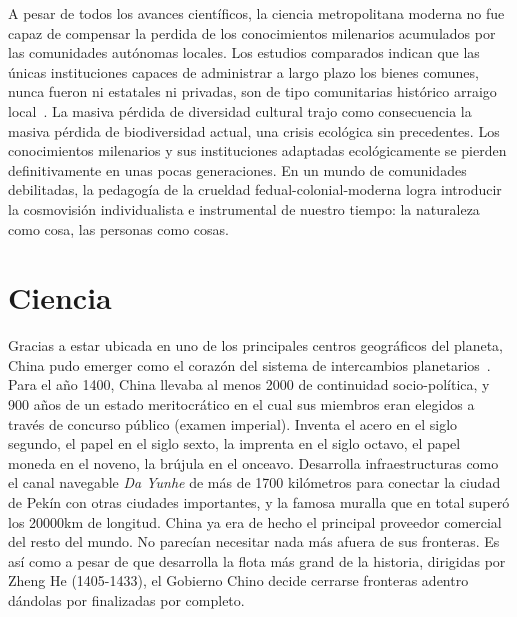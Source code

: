 \documentclass[a4paper,10pt]{book}
\begin{document}


% 

A pesar de todos los avances científicos, la ciencia metropolitana moderna no fue capaz de compensar la perdida de los conocimientos milenarios acumulados por las comunidades autónomas locales.
Los estudios comparados indican que las únicas instituciones capaces de administrar a largo plazo los bienes comunes, nunca fueron ni estatales ni privadas, son de tipo comunitarias histórico arraigo local~\cite{ostrom2009,ostrom1990}.
La masiva pérdida de diversidad cultural trajo como consecuencia la masiva pérdida de biodiversidad actual, una crisis ecológica sin precedentes.
Los conocimientos milenarios y sus instituciones adaptadas ecológicamente se pierden definitivamente en unas pocas generaciones.
En un mundo de comunidades debilitadas, la pedagogía de la crueldad fedual-colonial-moderna logra introducir la cosmovisión individualista e instrumental de nuestro tiempo: la naturaleza como cosa, las personas como cosas.

\section{Ciencia}

Gracias a estar ubicada en uno de los principales centros geográficos del planeta, China pudo emerger como el corazón del sistema de intercambios planetarios~\cite{pomeranz2000}.
Para el año 1400, China llevaba al menos 2000 de continuidad socio-pol\'itica, y 900 a\~nos de un estado meritocr\'atico en el cual sus miembros eran elegidos a trav\'es de concurso público (examen imperial).
Inventa el acero en el siglo segundo, el papel en el siglo sexto, la imprenta en el siglo octavo, el papel moneda en el noveno, la br\'ujula en el onceavo.
Desarrolla infraestructuras como el canal navegable \emph{Da Yunhe} de más de 1700 kilómetros para conectar la ciudad de Pekín con otras ciudades importantes, y la famosa muralla que en total superó los 20000km de longitud.
China ya era de hecho el principal proveedor comercial del resto del mundo.
No parecían necesitar nada más afuera de sus fronteras.
Es así como a pesar de que desarrolla la flota más grand de la historia, dirigidas por Zheng He (1405-1433), el Gobierno Chino decide cerrarse fronteras adentro dándolas por finalizadas por completo.
\end{document}
